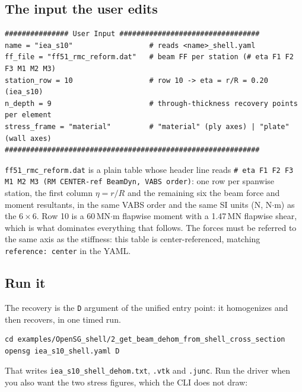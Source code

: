 \subsection{The input the user edits}

\begin{lstlisting}[style=opensg,caption={The user-input block of beam\_dehom\_shell.py.},basicstyle=\ttfamily\footnotesize]
############### User Input #################################
name = "iea_s10"                  # reads <name>_shell.yaml
ff_file = "ff51_rmc_reform.dat"   # beam FF per station (# eta F1 F2 F3 M1 M2 M3)
station_row = 10                  # row 10 -> eta = r/R = 0.20 (iea_s10)
n_depth = 9                       # through-thickness recovery points per element
stress_frame = "material"         # "material" (ply axes) | "plate" (wall axes)
############################################################
\end{lstlisting}

\texttt{ff51\_rmc\_reform.dat} is a plain table whose header line reads
\texttt{\# eta F1 F2 F3 M1 M2 M3 (RM CENTER-ref BeamDyn, VABS order)}: one row per
spanwise station, the first column $\eta = r/R$ and the remaining six the beam
force and moment resultants, in the same VABS order and the same SI units (N,
N$\cdot$m) as the $6\times6$. Row 10 is
a 60\,MN$\cdot$m flapwise moment with a 1.47\,MN flapwise shear, which is what
dominates everything that follows. The forces must be referred to the same axis
as the stiffness: this table is center-referenced, matching
\texttt{reference: center} in the YAML.

\subsection{Run it}

The recovery is the \texttt{D} argument of the unified entry point: it
homogenizes and then recovers, in one timed run.

\begin{lstlisting}[style=shellst]
cd examples/OpenSG_shell/2_get_beam_dehom_from_shell_cross_section
opensg iea_s10_shell.yaml D
\end{lstlisting}

\noindent
That writes \texttt{iea\_s10\_shell\_dehom.txt}, \texttt{.vtk} and
\texttt{.junc}. Run the driver when you also want the two stress figures, which
the CLI does not draw:


